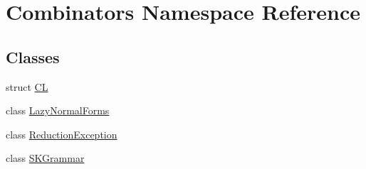 \hypertarget{namespace_combinators}{}\section{Combinators Namespace Reference}
\label{namespace_combinators}
\subsection*{Classes}
\begin{DoxyCompactItemize}
\item 
struct \hyperlink{struct_combinators_1_1_c_l}{CL}
\item 
class \hyperlink{class_combinators_1_1_lazy_normal_forms}{Lazy\+Normal\+Forms}
\item 
class \hyperlink{class_combinators_1_1_reduction_exception}{Reduction\+Exception}
\item 
class \hyperlink{class_combinators_1_1_s_k_grammar}{S\+K\+Grammar}
\end{DoxyCompactItemize}
